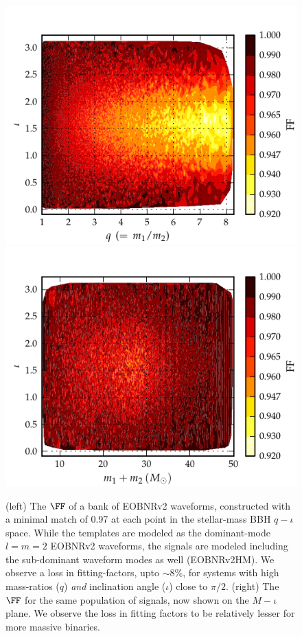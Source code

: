 \begin{figure}
\centering
\includegraphics[scale=0.04, clip=false, totalheight=0.3\textheight, width=\columnwidth]{figures/eobpnmetric/EOBHMvsEOB22incvsq-PRD.pdf} %
\includegraphics[scale=0.04, clip=false, totalheight=0.3\textheight, width=\columnwidth]{figures/eobpnmetric/EOBHMvsEOB22incvsM-PRD.pdf} %
\caption{\label{fig:incvsM_eob22eobhm} (left) The $\FF$ of a
bank of EOBNRv2 waveforms, constructed with a minimal match of 0.97 at each
point in the stellar-mass BBH $q-\iota$ space. While the templates are
modeled as the dominant-mode $l=m=2$ EOBNRv2 waveforms, the signals are modeled 
including the sub-dominant waveform modes as well (EOBNRv2HM). We observe a loss in fitting-factors, upto $\sim 8\%$, for 
systems with high mass-ratios ($q$) \textit{and} inclination angle ($\iota$) close to $\pi/2$.
(right) The $\FF$ for the same population of signals, now shown on the $M-\iota$ plane. We observe the loss in fitting factors to be relatively lesser
for more massive binaries.}
\end{figure}
